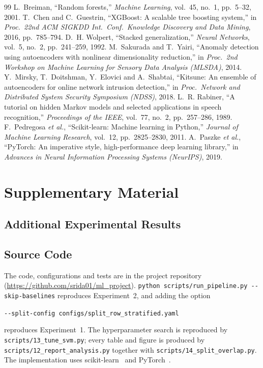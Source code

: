 \documentclass[12pt,a4paper,oneside]{report}
\begin{document}
\begin{singlespace}
\begin{thebibliography}{99}
 L.~Breiman, ``Random forests,'' \textit{Machine Learning}, vol.~45, no.~1, pp.~5--32, 2001.
 T.~Chen and C.~Guestrin, ``XGBoost: A scalable tree boosting system,'' in \textit{Proc.\ 22nd ACM SIGKDD Int.\ Conf.\ Knowledge Discovery and Data Mining}, 2016, pp.~785--794.
 D.~H. Wolpert, ``Stacked generalization,'' \textit{Neural Networks}, vol.~5, no.~2, pp.~241--259, 1992.
 M.~Sakurada and T.~Yairi, ``Anomaly detection using autoencoders with nonlinear dimensionality reduction,'' in \textit{Proc.\ 2nd Workshop on Machine Learning for Sensory Data Analysis (MLSDA)}, 2014.
 Y.~Mirsky, T.~Doitshman, Y.~Elovici and A.~Shabtai, ``Kitsune: An ensemble of autoencoders for online network intrusion detection,'' in \textit{Proc.\ Network and Distributed System Security Symposium (NDSS)}, 2018.
 L.~R. Rabiner, ``A tutorial on hidden Markov models and selected applications in speech recognition,'' \textit{Proceedings of the IEEE}, vol.~77, no.~2, pp.~257--286, 1989.
 F.~Pedregosa \textit{et al.}, ``Scikit-learn: Machine learning in Python,'' \textit{Journal of Machine Learning Research}, vol.~12, pp.~2825--2830, 2011.
 A.~Paszke \textit{et al.}, ``PyTorch: An imperative style, high-performance deep learning library,'' in \textit{Advances in Neural Information Processing Systems (NeurIPS)}, 2019.
\end{thebibliography}
\end{singlespace}

\appendix

\chapter{Supplementary Material}
\section{Additional Experimental Results}


\section{Source Code}
{\sloppy The code, configurations and tests are in the project repository (\url{https://github.com/srida01/ml_project}). \texttt{python scripts/run\_pipeline.py -{}-skip-baselines} reproduces Experiment~2, and adding the option
\begin{center}\texttt{-{}-split-config configs/split\_row\_stratified.yaml}\end{center}
reproduces Experiment~1. The hyperparameter search is reproduced by \texttt{scripts/13\_tune\_svm.py}; every table and figure is produced by \texttt{scripts/12\_report\_analysis.py} together with \texttt{scripts/14\_split\_overlap.py}. The implementation uses scikit-learn~\cite{pedregosa2011scikit} and PyTorch~\cite{paszke2019pytorch}.\par}
\end{document}
